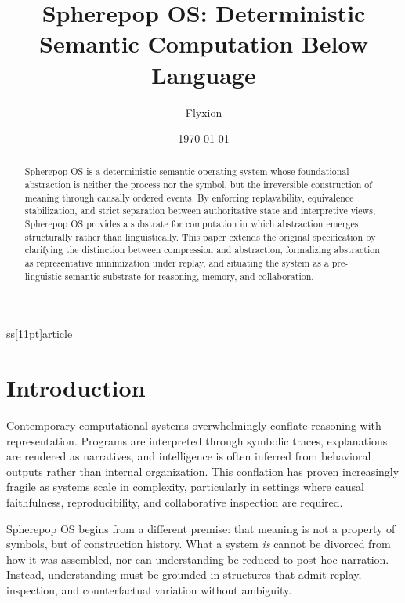 ss[11pt]{article}

\usepackage{geometry}
\usepackage{setspace}
\usepackage{amsmath,amssymb,amsthm}
\usepackage{mathtools}
\usepackage{microtype}
\usepackage{hyperref}
\usepackage{csquotes}

\geometry{margin=1in}

\newtheorem{definition}{Definition}[section]
\newtheorem{theorem}{Theorem}[section]
\newtheorem{proposition}{Proposition}[section]

\title{Spherepop OS: Deterministic Semantic Computation Below Language}
\author{Flyxion}
\date{\today}


\maketitle

\begin{abstract}
Spherepop OS is a deterministic semantic operating system whose foundational abstraction is neither the process nor the symbol, but the irreversible construction of meaning through causally ordered events. By enforcing replayability, equivalence stabilization, and strict separation between authoritative state and interpretive views, Spherepop OS provides a substrate for computation in which abstraction emerges structurally rather than linguistically. This paper extends the original specification by clarifying the distinction between compression and abstraction, formalizing abstraction as representative minimization under replay, and situating the system as a pre-linguistic semantic substrate for reasoning, memory, and collaboration.
\end{abstract}

\section{Introduction}

Contemporary computational systems overwhelmingly conflate reasoning with representation. Programs are interpreted through symbolic traces, explanations are rendered as narratives, and intelligence is often inferred from behavioral outputs rather than internal organization. This conflation has proven increasingly fragile as systems scale in complexity, particularly in settings where causal faithfulness, reproducibility, and collaborative inspection are required.

Spherepop OS begins from a different premise: that meaning is not a property of symbols, but of construction history. What a system \emph{is} cannot be divorced from how it was assembled, nor can understanding be reduced to post hoc narration. Instead, understanding must be grounded in structures that admit replay, inspection, and counterfactual variation without ambiguity.

